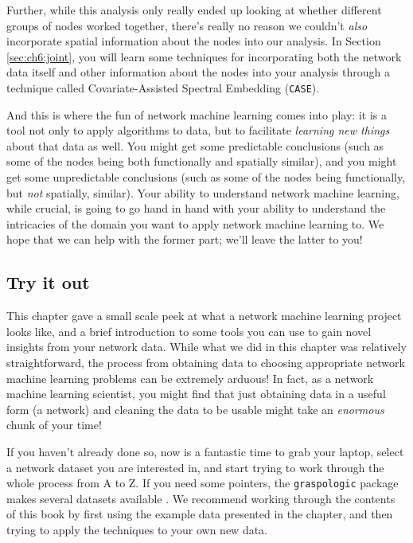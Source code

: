 Further, while this analysis only really ended up looking at whether different groups of nodes worked together, there's really no reason we couldn't \emph{also} incorporate spatial information about the nodes into our analysis. In Section \ref{sec:ch6:joint}, you will learn some techniques for incorporating both the network data itself and other information about the nodes into your analysis through a technique called Covariate-Assisted Spectral Embedding (\texttt{CASE}).

And this is where the fun of network machine learning comes into play: it is a tool not only to apply algorithms to data, but to facilitate \emph{learning new things} about that data as well. You might get some predictable conclusions (such as some of the nodes being both functionally and spatially similar), and you might get some unpredictable conclusions (such as some of the nodes being functionally, but \emph{not} spatially, similar). Your ability to understand network machine learning, while crucial, is going to go hand in hand with your ability to understand the intricacies of the domain you want to apply network machine learning to. We hope that we can help with the former part; we'll leave the latter to you!

\subsection{Try it out}

This chapter gave a small scale peek at what a network machine learning project looks like, and a brief introduction to some tools you can use to gain novel insights from your network data. While what we did in this chapter was relatively straightforward, the process from obtaining data to choosing appropriate network machine learning problems can be extremely arduous! In fact, as a network machine learning scientist, you might find that just obtaining data in a useful form (a network) and cleaning the data to be usable might take an \emph{enormous} chunk of your time!

If you haven't already done so, now is a fantastic time to grab your laptop, select a network dataset you are interested in, and start trying to work through the whole process from A to Z. If you need some pointers, the \texttt{graspologic} package makes several datasets available \cite{graspydata}. We recommend working through the contents of this book by first using the example data presented in the chapter, and then trying to apply the techniques to your own new data.